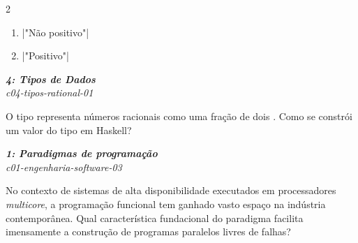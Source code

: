 \documentclass[a4paper,10pt,brazil]{article}
\begin{document}
\begin{multicols}{2}
\begin{enumerate}
  \item \haskellinline|"Não positivo"|

  \item \haskellinline|"Positivo"|


\end{enumerate}

\begin{flushright}
  \footnotesize
  \textit{\textbf{4: Tipos de Dados}}\\
  \textit{c04-tipos-rational-01}\\

\end{flushright}
O tipo  representa números racionais como uma fração de dois . Como se constrói um valor do tipo  em Haskell?


\begin{flushright}
  \footnotesize
  \textit{\textbf{1: Paradigmas de programação}}\\
  \textit{c01-engenharia-software-03}\\

\end{flushright}
No contexto de sistemas de alta disponibilidade executados em processadores \emph{multicore}, a programação funcional tem ganhado vasto espaço na indústria contemporânea. Qual característica fundacional do paradigma facilita imensamente a construção de programas paralelos livres de falhas?


\end{multicols}
\end{document}

